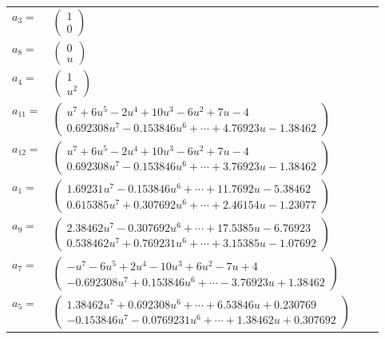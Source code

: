 \documentclass[1p]{elsarticle_modified}
\theoremstyle{definition}
\begin{document}
\begin{tabular}{m{7pt} m{180pt} m{7pt} m{180pt} }
\flushright $a_{3}=$&$\begin{pmatrix}1\\0\end{pmatrix}$ \\
\flushright $a_{8}=$&$\begin{pmatrix}0\\u\end{pmatrix}$ \\
\flushright $a_{4}=$&$\begin{pmatrix}1\\u^2\end{pmatrix}$ \\
\flushright $a_{11}=$&$\begin{pmatrix}u^7+6 u^5-2 u^4+10 u^3-6 u^2+7 u-4\\0.692308 u^{7}-0.153846 u^{6}+\cdots+4.76923 u-1.38462\end{pmatrix}$ \\
\flushright $a_{12}=$&$\begin{pmatrix}u^7+6 u^5-2 u^4+10 u^3-6 u^2+7 u-4\\0.692308 u^{7}-0.153846 u^{6}+\cdots+3.76923 u-1.38462\end{pmatrix}$ \\
\flushright $a_{1}=$&$\begin{pmatrix}1.69231 u^{7}-0.153846 u^{6}+\cdots+11.7692 u-5.38462\\0.615385 u^{7}+0.307692 u^{6}+\cdots+2.46154 u-1.23077\end{pmatrix}$ \\
\flushright $a_{9}=$&$\begin{pmatrix}2.38462 u^{7}-0.307692 u^{6}+\cdots+17.5385 u-6.76923\\0.538462 u^{7}+0.769231 u^{6}+\cdots+3.15385 u-1.07692\end{pmatrix}$ \\
\flushright $a_{7}=$&$\begin{pmatrix}- u^7-6 u^5+2 u^4-10 u^3+6 u^2-7 u+4\\-0.692308 u^{7}+0.153846 u^{6}+\cdots-3.76923 u+1.38462\end{pmatrix}$ \\
\flushright $a_{5}=$&$\begin{pmatrix}1.38462 u^{7}+0.692308 u^{6}+\cdots+6.53846 u+0.230769\\-0.153846 u^{7}-0.0769231 u^{6}+\cdots+1.38462 u+0.307692\end{pmatrix}$ \\

\end{tabular}
\end{document}
